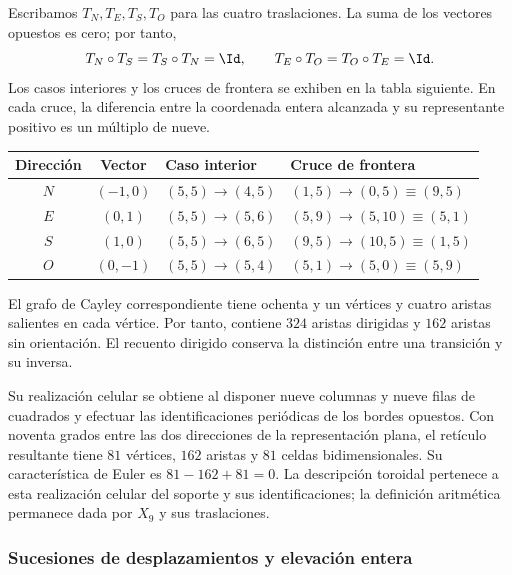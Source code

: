 Escribamos $T_N,T_E,T_S,T_O$ para las cuatro traslaciones. La suma de los vectores opuestos es cero; por tanto,
\[
 T_N\circ T_S=T_S\circ T_N=\Id,
 \qquad T_E\circ T_O=T_O\circ T_E=\Id.
\]
Los casos interiores y los cruces de frontera se exhiben en la tabla siguiente. En cada cruce, la diferencia entre la coordenada entera alcanzada y su representante positivo es un múltiplo de nueve.

\begin{tablacompleta}[htbp]
\caption{Transiciones interiores y cruces de frontera en la representación matricial de APP.}
\label{tab:app-frontera}
\begin{tabular}{ccll}
\toprule
Dirección & Vector & Caso interior & Cruce de frontera\\
\midrule
$N$ &$(-1,0)$&$(5,5)\to(4,5)$&$(1,5)\to(0,5)\equiv(9,5)$\\
$E$ &$(0,1)$&$(5,5)\to(5,6)$&$(5,9)\to(5,10)\equiv(5,1)$\\
$S$ &$(1,0)$&$(5,5)\to(6,5)$&$(9,5)\to(10,5)\equiv(1,5)$\\
$O$ &$(0,-1)$&$(5,5)\to(5,4)$&$(5,1)\to(5,0)\equiv(5,9)$\\
\bottomrule
\end{tabular}
\end{tablacompleta}

El grafo de Cayley correspondiente tiene ochenta y un vértices y cuatro aristas salientes en cada vértice. Por tanto, contiene $324$ aristas dirigidas y $162$ aristas sin orientación. El recuento dirigido conserva la distinción entre una transición y su inversa.

Su realización celular se obtiene al disponer nueve columnas y nueve filas de cuadrados y efectuar las identificaciones periódicas de los bordes opuestos. Con noventa grados entre las dos direcciones de la representación plana, el retículo resultante tiene $81$ vértices, $162$ aristas y $81$ celdas bidimensionales. Su característica de Euler es $81-162+81=0$. La descripción toroidal pertenece a esta realización celular del soporte y sus identificaciones; la definición aritmética permanece dada por $X_9$ y sus traslaciones.

\subsubsection{Sucesiones de desplazamientos y elevación entera}

